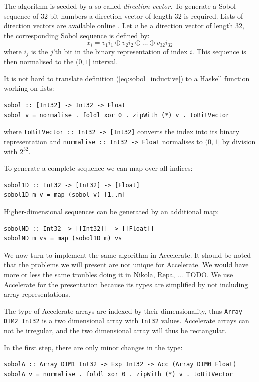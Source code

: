 \documentclass{llncs2e/llncs}
\begin{document}
The algorithm is seeded by a so called \emph{direction vector}. To
generate a Sobol sequence of $32$-bit numbers a direction vector of
length $32$ is required.  Lists of direction vectors are available
online \cite{homepage:sobol:directionvectors}. Let $v$ be a direction
vector of length $32$, the corresponding Sobol sequence is defined by:
\begin{equation}
x_i = v_1i_1 \oplus v_2i_2 \oplus \ldots \oplus v_{32}i_{32}\label{eq:sobol_inductive}
\end{equation}
where $i_j$ is the $j$'th bit in the binary representation of index
$i$. This sequence is then normalised to the $(0,1]$ interval.

It is not hard to translate definition (\ref{eq:sobol_inductive}) to a
Haskell function working on lists:
\begin{verbatim}
sobol :: [Int32] -> Int32 -> Float
sobol v = normalise . foldl xor 0 . zipWith (*) v . toBitVector
\end{verbatim}
where \verb|toBitVector :: Int32 -> [Int32]| converts the index into
its binary representation and \verb|normalise :: Int32 -> Float|
normalises to $(0,1]$ by division with $2^{32}$.

To generate a complete sequence we can map over all indices:
\begin{verbatim}
sobol1D :: Int32 -> [Int32] -> [Float]
sobol1D m v = map (sobol v) [1..m]
\end{verbatim}
Higher-dimensional sequences can be generated by an additional map:
\begin{verbatim}
sobolND :: Int32 -> [[Int32]] -> [[Float]]
sobolND m vs = map (sobol1D m) vs
\end{verbatim}

We now turn to implement the same algorithm in Accelerate. It should
be noted that the problems we will present are not unique for
Accelerate. We would have more or less the same troubles doing it in
Nikola, Repa, ...  TODO. We use Accelerate for the presentation
because its types are simplified by not including array
representations. 

The type of Accelerate arrays are indexed by their dimensionality,
thus \verb|Array DIM2 Int32| is a two dimensional array with
\verb|Int32| values. Accelerate arrays can not be irregular, and the
two dimensional array will thus be rectangular.

In the first step, there are only minor changes in the type:
\begin{verbatim}
sobolA :: Array DIM1 Int32 -> Exp Int32 -> Acc (Array DIM0 Float)
sobolA v = normalise . foldl xor 0 . zipWith (*) v . toBitVector
\end{verbatim}
\end{document}
